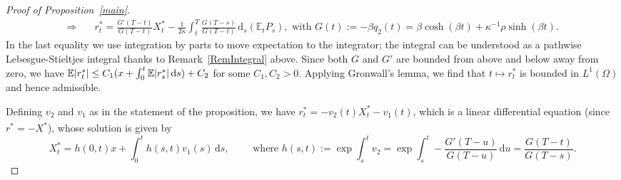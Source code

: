 \documentclass[openany,oneside]{article}
\theoremstyle{definition}
\theoremstyle{remark}
\newcommand{\E}{\mathbb{E}} %
\DeclarePairedDelimiter{\abs}{\lvert}{\rvert} %
\newcommand{\ts}{\textstyle}
\newcommand{\de}{\,\mathrm{d}}
\begin{document}
\begin{proof}[Proof of Proposition~\ref{main}]
\begin{align*}
\Rightarrow\quad &\ts r^\ast_t = \frac{G'(T-t)}{G(T-t)} X^\ast_t - \frac{1}{2\kappa} \int_t^T \frac{G(T-s)}{G(T-t)} \de _s(\E_t P_s), \textrm{ with } G(t):=-\beta q_2(t) = \beta\cosh(\beta t)+\kappa^{-1}\rho\sinh(\beta t).
\end{align*}
In the last equality we use integration by parts to move expectation to the integrator; the integral can be understood as a pathwise Lebesgue-Stieltjes integral thanks to Remark~\ref{RemIntegral} above. Since both $G$ and $G'$ are bounded from above and below away from zero, we have $\E\abs{r^\ast_t} \le C_1 (x+\int_0^t \E\abs{r^\ast_s} \de s) + C_2$ for some $C_1, C_2 > 0$. Applying Gronwall's lemma, we find that $t\mapsto r^\ast_t$ is bounded in $L^1(\Omega)$ and hence admissible.

Defining $v_2$ and $v_1$ as in the statement of the proposition, we have $r^\ast_t = -v_2(t)X^\ast_t -v_1(t)$, which is a linear differential equation (since $r^\ast=-\dot{X^\ast}$), whose solution is given by
\[
\ts X^\ast_t = h(0,t)x + \int_0^t h(s,t)v_1(s) \de s,\qquad \textrm{ where } h(s,t):=\exp\int_s^t v_2 = \exp\int_s^t -\frac{G'(T-u)}{G(T-u)}\de u=\frac{G(T-t)}{G(T-s)}.
\]


\end{proof}
\end{document}
